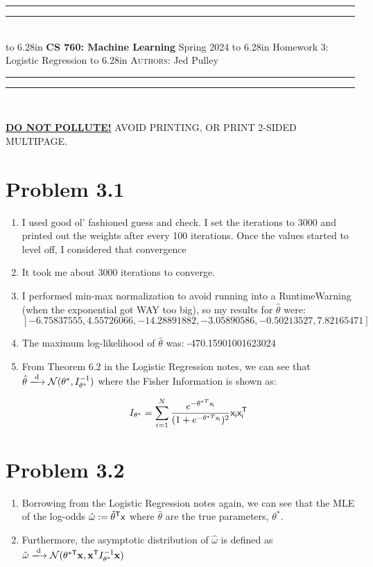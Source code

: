 \documentclass{article}
\newcommand{\lecture}[2]{
\pagestyle{myheadings}
\thispagestyle{plain}
\newpage
\noindent
\begin{center}
\rule{\textwidth}{1.6pt}\vspace*{-\baselineskip}\vspace*{2pt} %
\rule{\textwidth}{0.4pt}\\[1\baselineskip] %
\vbox{\vspace{2mm}
\hbox to 6.28in { {\bf CS 760: Machine Learning} \hfill Spring 2024 }
\vspace{4mm}
\hbox to 6.28in { {\Large \hfill #1  \hfill} }
\vspace{4mm}
\hbox to 6.28in { {\scshape Authors:}  #2 \hfill }}
\vspace{-2mm}
\rule{\textwidth}{0.4pt}\vspace*{-\baselineskip}\vspace{3.2pt} %
\rule{\textwidth}{1.6pt}\\[\baselineskip] %
\end{center}
\vspace*{4mm}
}
\begin{document}
\lecture{Homework 3: Logistic Regression}{Jed Pulley}

\begin{center}
{\Large {\sf \underline{\textbf{DO NOT POLLUTE!}} AVOID PRINTING, OR PRINT 2-SIDED MULTIPAGE.}}
\end{center}

\section*{Problem 3.1}
\begin{enumerate}[label=(\alph*)]
  \item I used good ol' fashioned guess and check. I set the iterations to 3000 and printed out the weights after every 100 iterations. Once the values started to level off, I considered that convergence
  \item It took me about 3000 iterations to converge.
  \item I performed min-max normalization to avoid running into a RuntimeWarning (when the exponential got WAY too big), so my results for $\hat{\theta}$ were: \[[-6.75837555, 4.55726066, -14.28891882, -3.05890586, -0.50213527, 7.82165471]\]
  \item The maximum log-likelihood of $\hat{\theta}$ was: -470.15901001623024
  \item From Theorem 6.2 in the Logistic Regression notes, we can see that $\hat{\theta} \xlongrightarrow[\text{}]{\text{d}} \mathcal{N}(\theta^*, I^{-1}_{\theta^*})$ where the Fisher Information is shown as: \[I_{\theta^*} = \sum_{i=1}^{N}\frac{e^{-\theta^{*T}\sf{x}_i}}{(1 + e^{-\theta^{*T}\sf{x}_i})^2}\sf{x}_i\sf{x}^{\sf{T}}_i\]
\end{enumerate}

\section*{Problem 3.2}
\begin{enumerate}[label=(\alph*)]
  \item Borrowing from the Logistic Regression notes again, we can see that the MLE of the log-odds $\hat{\omega} := \hat{\theta}^{\sf{T}}\sf{x}$ where $\hat{\theta}$ are the true parameters, $\theta^*$.
  \item Furthermore, the asymptotic distribution of $\hat{\omega}$ is defined as $\hat{\omega} \xlongrightarrow[\text{}]{\text{d}} \mathcal{N}(\theta^{*\sf{T}}\textbf{x}, \textbf{x}^{\sf{T}}I^{-1}_{\theta^*}\textbf{x})$
\end{enumerate}
\end{document}
